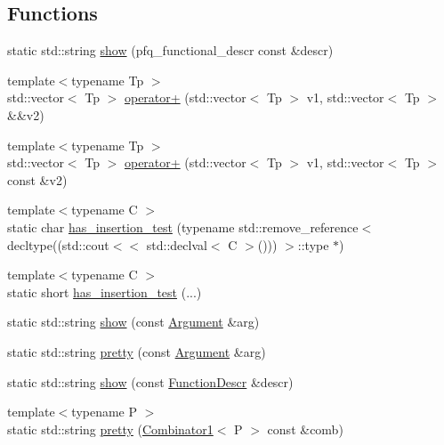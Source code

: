 \subsection*{Functions}
\begin{DoxyCompactItemize}
\item 
static std\+::string \hyperlink{namespacepfq__lang_a1a60cc110a7a44a7d94775d5d6b1692d}{show} (pfq\+\_\+functional\+\_\+descr const \&descr)
\item 
{\footnotesize template$<$typename Tp $>$ }\\std\+::vector$<$ Tp $>$ \hyperlink{namespacepfq__lang_a8eb2d24aa20548df55924d37824e46b2}{operator+} (std\+::vector$<$ Tp $>$ v1, std\+::vector$<$ Tp $>$ \&\&v2)
\item 
{\footnotesize template$<$typename Tp $>$ }\\std\+::vector$<$ Tp $>$ \hyperlink{namespacepfq__lang_a607e3c40cd65152da1a8d90ea40f8c33}{operator+} (std\+::vector$<$ Tp $>$ v1, std\+::vector$<$ Tp $>$ const \&v2)
\item 
{\footnotesize template$<$typename C $>$ }\\static char \hyperlink{namespacepfq__lang_a8b5af237a48336a48908f14d16a5e740}{has\+\_\+insertion\+\_\+test} (typename std\+::remove\+\_\+reference$<$ decltype((std\+::cout$<$$<$ std\+::declval$<$ C $>$())) $>$\+::type $\ast$)
\item 
{\footnotesize template$<$typename C $>$ }\\static short \hyperlink{namespacepfq__lang_a60380b938a5abdb0c9604837f2a523a7}{has\+\_\+insertion\+\_\+test} (...)
\item 
static std\+::string \hyperlink{namespacepfq__lang_af1f5c155d6ec60eb25b342aeb430ab7c}{show} (const \hyperlink{structpfq__lang_1_1Argument}{Argument} \&arg)
\item 
static std\+::string \hyperlink{namespacepfq__lang_ad57eb73340d285cb26cdb9cb2cc046d4}{pretty} (const \hyperlink{structpfq__lang_1_1Argument}{Argument} \&arg)
\item 
static std\+::string \hyperlink{namespacepfq__lang_a90467c48a84afeb46509ab105ce1f789}{show} (const \hyperlink{structpfq__lang_1_1FunctionDescr}{Function\+Descr} \&descr)
\item 
{\footnotesize template$<$typename P $>$ }\\static std\+::string \hyperlink{namespacepfq__lang_a6839c256e31592f52549ac129c9e791a}{pretty} (\hyperlink{structpfq__lang_1_1Combinator1}{Combinator1}$<$ P $>$ const \&comb)
\item 
$$
\end{DoxyCompactItemize}
